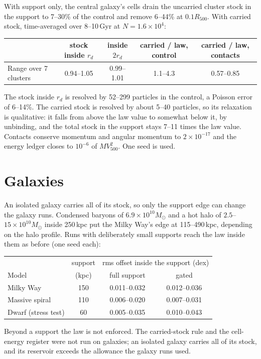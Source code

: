 \documentclass[11pt]{article}
\begin{document}
With support only, the central galaxy's cells drain the uncarried cluster stock in the
support to 7--30\% of the control and remove 6--44\% at $0.1R_{500}$. With carried stock,
time-averaged over 8--10\,Gyr at $N=1.6\times10^4$:
\begin{center}
\small
\begin{tabular}{lcccc}
\toprule
& stock inside $r_d$ & inside $2r_d$ & carried / law, control & carried / law, contacts\\
\midrule
Range over 7 clusters & 0.94--1.05 & 0.99--1.01 & 1.1--4.3 & 0.57--0.85\\
\bottomrule
\end{tabular}
\end{center}
The stock inside $r_d$ is resolved by 52--299 particles in the control, a Poisson error
of 6--14\%. The carried stock is resolved by about 5--40 particles, so its relaxation is
qualitative: it falls from above the law value to somewhat below it, by unbinding, and
the total stock in the support stays 7--11 times the law value. Contacts conserve momentum
and angular momentum to $2\times10^{-17}$ and the energy ledger closes to $10^{-6}$ of
$MV_{500}^2$. One seed is used.

\section{Galaxies}
An isolated galaxy carries all of its stock, so only the support edge can change the
galaxy runs. Condensed baryons of $6.9\times10^{10}M_\odot$ and a hot halo of
$2.5$--$15\times10^{10}M_\odot$ inside 250\,kpc put the Milky Way's edge at 115--490\,kpc,
depending on the halo profile. Runs with deliberately small supports reach the law inside
them as before (one seed each):
\begin{center}
\small
\begin{tabular}{lccc}
\toprule
& support & \multicolumn{2}{c}{rms offset inside the support (dex)}\\
Model & (kpc) & full support & gated\\
\midrule
Milky Way & 150 & 0.011--0.032 & 0.012--0.036\\
Massive spiral & 110 & 0.006--0.020 & 0.007--0.031\\
Dwarf (stress test) & 60 & 0.005--0.035 & 0.010--0.043\\
\bottomrule
\end{tabular}
\end{center}
Beyond a support the law is not enforced. The carried-stock rule and the cell-energy
register were not run on galaxies; an isolated galaxy carries all of its stock, and its
reservoir exceeds the allowance the galaxy runs used.
\end{document}
